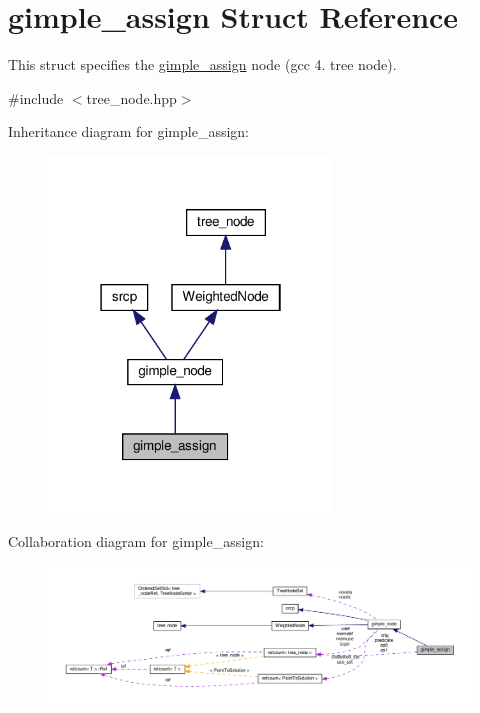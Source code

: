 \hypertarget{structgimple__assign}{}\section{gimple\+\_\+assign Struct Reference}
\label{structgimple__assign}


This struct specifies the \hyperlink{structgimple__assign}{gimple\+\_\+assign} node (gcc 4. tree node).  




{\ttfamily \#include $<$tree\+\_\+node.\+hpp$>$}



Inheritance diagram for gimple\+\_\+assign\+:
\nopagebreak
\begin{figure}[H]
\begin{center}
\leavevmode
\includegraphics[width=214pt]{d2/dbe/structgimple__assign__inherit__graph}
\end{center}
\end{figure}


Collaboration diagram for gimple\+\_\+assign\+:
\nopagebreak
\begin{figure}[H]
\begin{center}
\leavevmode
\includegraphics[width=350pt]{d0/d7e/structgimple__assign__coll__graph}
\end{center}
\end{figure}
